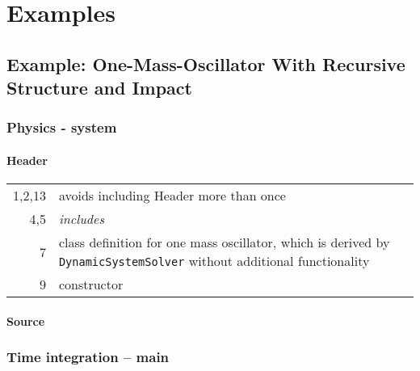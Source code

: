 \section{Examples}

\subsection{Example: One-Mass-Oscillator With Recursive Structure and Impact}

\hspace*{0.2\hsize}

\subsubsection{Physics - system}

\paragraph{Header}



\begin{tabular}{r|p{0.85\hsize}}
  1,2,13 & avoids including Header more than once\\
  4,5  & \emph{includes}\\
  7 & class definition for one mass oscillator, which is derived by \texttt{DynamicSystemSolver} without additional functionality\\
  9 & constructor
\end{tabular}

\paragraph{Source}



\subsubsection{Time integration -- main}

